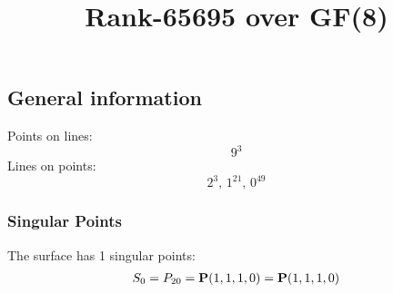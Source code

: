 \documentclass{article}
\newcommand\setTBstruts{\def\T{\rule{0pt}{2.6ex}}%
\def\B{\rule[-1.2ex]{0pt}{0pt}}}
\newcommand{\bP}{{\bf P}}
\begin{document}
 
\setTBstruts



{\allowdisplaybreaks%






\title{Rank-65695 over GF(8)}
\author{}%
\maketitle%
%
{}



\subsection*{General information}
Points on lines:
$$
9^3$$
Lines on points:
$$
2^3,\,1^{21},\,0^{49}$$
\subsubsection*{Singular Points}
The surface has 1 singular points:\\
\begin{align*}
S_{0} &= P_{20}=\bP(1, 1, 1, 0) = \bP(1, 1, 1, 0)\\
\end{align*}
}
\end{document}
